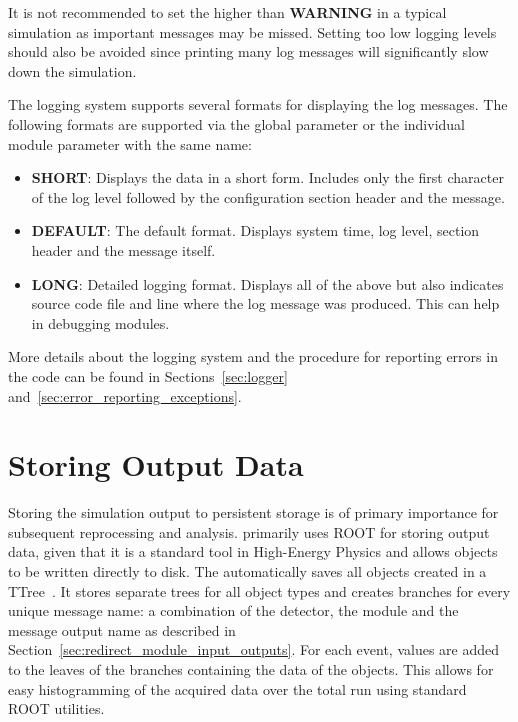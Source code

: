 \begin{itemize}
\begin{warning}
    It is not recommended to set the  higher than \textbf{WARNING} in a typical simulation as important messages may be missed.
    Setting too low logging levels should also be avoided since printing many log messages will significantly slow down the simulation.
\end{warning}

The logging system supports several formats for displaying the log messages.
The following formats are supported via the global parameter  or the individual module parameter with the same name:
\begin{itemize}
\item \textbf{SHORT}: Displays the data in a short form.
Includes only the first character of the log level followed by the configuration section header and the message.
\item \textbf{DEFAULT}: The default format.
Displays system time, log level, section header and the message itself.
\item \textbf{LONG}: Detailed logging format.
Displays all of the above but also indicates source code file and line where the log message was produced.
This can help in debugging modules.
\end{itemize}

More details about the logging system and the procedure for reporting errors in the code can be found in Sections~\ref{sec:logger} and~\ref{sec:error_reporting_exceptions}.

\section{Storing Output Data}
\label{sec:storing_output_data}
Storing the simulation output to persistent storage is of primary importance for subsequent reprocessing and analysis.
\apsq primarily uses ROOT for storing output data, given that it is a standard tool in High-Energy Physics and allows objects to be written directly to disk.
The  automatically saves all objects created in a TTree~\cite{roottree}.
It stores separate trees for all object types and creates branches for every unique message name: a combination of the detector, the module and the message output name as described in Section~\ref{sec:redirect_module_input_outputs}.
For each event, values are added to the leaves of the branches containing the data of the objects.
This allows for easy histogramming of the acquired data over the total run using standard ROOT utilities.


\end{itemize}
